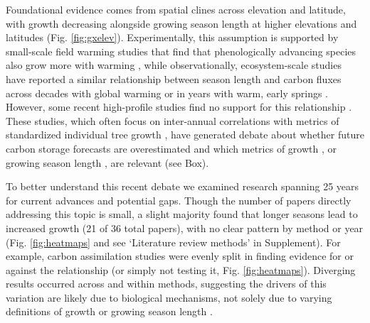 \documentclass[11pt]{article}
\begin{document}
Foundational evidence comes from spatial clines across elevation and latitude, with growth decreasing alongside growing season length at higher elevations and latitudes (Fig. \ref{fig:gxelev}). Experimentally, this assumption is supported by small-scale field warming studies that find that phenologically advancing species also grow more with warming \citep[][]{Cleland:2012}, while observationally, ecosystem-scale studies have reported a similar relationship between season length and carbon fluxes across decades with global warming \citep{keenan2014net} or in years with warm, early springs \citep{chen1999effects}. However, some recent high-profile studies find no support for this relationship \citep{dow2022warm}. These studies, which often focus on inter-annual correlations with metrics of standardized individual tree growth \citep{dow2022warm,silvestro2023longer}, have generated debate about whether future carbon storage forecasts are overestimated and which metrics of growth \citep{green2022limits}, or growing season length \citep{korner2023four}, are relevant (see Box).

To better understand this recent debate we examined research spanning 25 years for current advances and potential gaps. Though the number of papers directly addressing this topic is small, a slight majority found that longer seasons lead to increased growth (21 of 36 total papers), with no clear pattern by method or year (Fig. \ref{fig:heatmaps} and see `Literature review methods' in Supplement). For example, carbon assimilation studies were evenly split in finding evidence for or against the relationship  (or simply not testing it, Fig. \ref{fig:heatmaps}). Diverging results occurred across and within methods, suggesting the drivers of this variation are likely due to biological mechanisms, not solely due to varying definitions of growth or growing season length \citep[as some have recently suggested, e.g.][and see Box]{green2022limits,korner2023four}. 
\end{document}
